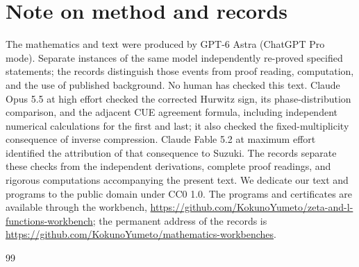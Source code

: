 \documentclass[11pt,a4paper]{article}
\theoremstyle{definition}
\theoremstyle{remark}
\newcommand{\workbenchurl}{https://github.com/KokunoYumeto/zeta-and-l-functions-workbench}
\newcommand{\recordurl}{https://github.com/KokunoYumeto/mathematics-workbenches}
\begin{document}


\section*{Note on method and records}
The mathematics and text were produced by GPT-6 Astra (ChatGPT Pro mode). Separate instances of the same model independently re-proved specified statements; the records distinguish those events from proof reading, computation, and the use of published background. No human has checked this text. Claude Opus 5.5 at high effort checked the corrected Hurwitz sign, its phase-distribution comparison, and the adjacent CUE agreement formula, including independent numerical calculations for the first and last; it also checked the fixed-multiplicity consequence of inverse compression. Claude Fable 5.2 at maximum effort identified the attribution of that consequence to Suzuki. The records separate these checks from the independent derivations, complete proof readings, and rigorous computations accompanying the present text. We dedicate our text and programs to the public domain under CC0 1.0. The programs and certificates are available through the workbench, \url{\workbenchurl}; the permanent address of the records is \url{\recordurl}.

\begin{thebibliography}{99}
\setlength{\itemsep}{2pt plus 1pt minus 1pt}
\setlength{\parsep}{0pt}
\setlength{\parskip}{0pt}

\end{thebibliography}
\end{document}
